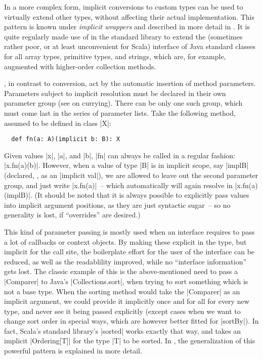 In a more complex form, implicit conversions to custom types can be used to virtually extend other
types, without affecting their actual implementation. This pattern is known under \emph{implicit
  wrappers} and described in more detail in . It is quite regularly made
use of in the standard library to extend the (sometimes rather poor, or at least unconvenient for
Scala) interface of Java standard classes for all array types, primitive types, and strings, which
are, for example, augmented with higher-order collection methods.

, in contrast to conversion, act by the automatic insertion of
method parameters. Parameters subject to implicit resolution must be declared in their own parameter
group (see  on currying). There can be only one such group, which must
come last in the series of parameter lists. Take the following method, assumed to be defined in
class |X|:
\begin{lstlisting}
  def fn(a: A)(implicit b: B): X
\end{lstlisting}
Given values |x|, |a|, and |b|, |fn| can always be called in a regular fashion:
|x.fn(a)(b)|. However, when a value of type |B| is in implicit scope, say |implB| (declared, \eg, as
an |implicit val|), we are allowed to leave out the second parameter group, and just write
|x.fn(a)|~-- which automatically will again resolve in |x.fn(a)(implB)|. (It should be noted that it
is always possible to explicitly pass values into implicit argument positions, as they are just
syntactic sugar~-- so no generality is lost, if \enquote{overrides} are desired.)

This kind of parameter passing is mostly used when an interface requires to pass a lot of callbacks
or context objects. By making these explicit in the type, but implicit for the call site, the
boilerplate effort for the user of the interface can be reduced, as well as the readablility
improved, while no \enquote{interface information} gets lost. The classic example of this is the
above-mentioned need to pass a |Comparer| to Java's |Collections.sort|, when trying to sort
something which is not a base type. When the sorting method would take the |Comparer| as an implicit
argument, we could provide it implicitly once and for all for every new type, and never see it being
passed explicitly (except cases when we want to change sort order in special ways, which are however
better fitted for |sortBy|). In fact, Scala's standard library's |sorted| works exactly that way,
and takes an implicit |Ordering[T]| for the type |T| to be sorted. In ,
the generalization of this powerful pattern is explained in more detail.

